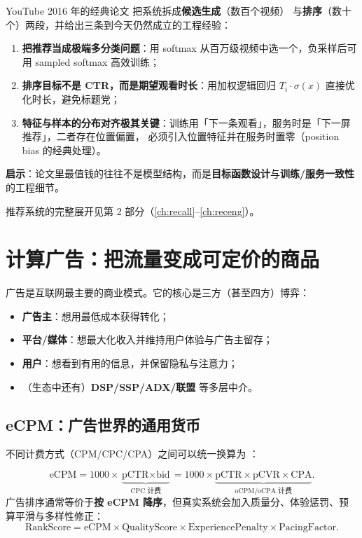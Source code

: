 \begin{casebox}
YouTube 2016 年的经典论文 \cite{covington2016youtube} 把系统拆成\textbf{候选生成}（数百个视频）
与\textbf{排序}（数十个）两段，并给出三条到今天仍然成立的工程经验：
\begin{enumerate}
  \item \textbf{把推荐当成极端多分类问题}：用 softmax 从百万级视频中选一个，负采样后可用 sampled softmax 高效训练；
  \item \textbf{排序目标不是 CTR，而是期望观看时长}：用加权逻辑回归 $T_i \cdot \sigma(x)$ 直接优化时长，避免标题党；
  \item \textbf{特征与样本的分布对齐极其关键}：训练用「下一条观看」，服务时是「下一屏推荐」，二者存在位置偏置，
        必须引入位置特征并在服务时置零（position bias 的经典处理）。
\end{enumerate}
\textbf{启示}：论文里最值钱的往往不是模型结构，而是\textbf{目标函数设计}与\textbf{训练/服务一致性}的工程细节。
\end{casebox}

推荐系统的完整展开见第 2 部分（\cref{ch:recall}--\cref{ch:receng}）。

\section{计算广告：把流量变成可定价的商品}

广告是互联网最主要的商业模式。它的核心是三方（甚至四方）博弈：

\begin{itemize}
  \item \textbf{广告主}：想用最低成本获得转化；
  \item \textbf{平台/媒体}：想最大化收入并维持用户体验与广告主留存；
  \item \textbf{用户}：想看到有用的信息，并保留隐私与注意力；
  \item （生态中还有）\textbf{DSP/SSP/ADX/联盟} 等多层中介。
\end{itemize}

\subsection{eCPM：广告世界的通用货币}

不同计费方式（CPM/CPC/CPA）之间可以统一换算为 ：

\begin{formulacard}
\begin{equation}
\text{eCPM} = 1000 \times \underbrace{\text{pCTR} \times \text{bid}}_{\text{CPC 计费}}
= 1000 \times \underbrace{\text{pCTR} \times \text{pCVR} \times \text{CPA}}_{\text{oCPM/oCPA 计费}} .
\label{eq:ecpm}
\end{equation}
广告排序通常等价于\textbf{按 eCPM 降序}，但真实系统会加入质量分、体验惩罚、预算平滑与多样性修正：
\begin{equation}
\text{RankScore} = \text{eCPM} \times \text{QualityScore} \times \text{ExperiencePenalty} \times \text{PacingFactor}.
\end{equation}
\end{formulacard}

